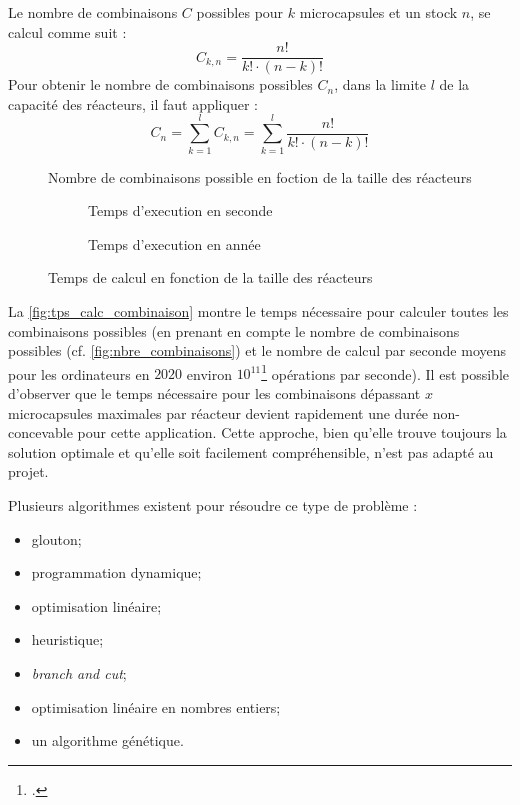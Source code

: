Le nombre de combinaisons $C$ possibles pour $k$ \glspl{microcapsule} et un stock $n$, se calcul comme suit :
\begin{equation}
    C_{k,n} = \frac{n!}{k!\cdot(n-k)!}
    \label{eq:combinaison}
\end{equation}
Pour obtenir le nombre de combinaisons possibles $C_n$, dans la limite $l$ de la capacité des réacteurs, il faut appliquer :
\begin{equation}
    C_{n} = \sum_{k = 1}^{l} C_{k,n} = \sum_{k=1}^{l}\frac{n!}{k!\cdot (n-k)!}
    \label{eq:nbre_combinaisons}
\end{equation} 
\begin{figure}[H]
    \centering
    
    \caption{Nombre de combinaisons possible en foction de la taille des réacteurs}
    \label{fig:nbre_combinaisons}
\end{figure}

\begin{figure}[H]
    \centering
    \begin{subfigure}{0.5\textwidth}
        \centering
        
        \caption{Temps d'execution en seconde}
    \end{subfigure}\hfill
    \begin{subfigure}{0.5\textwidth}
        \centering
        
        \caption{Temps d'execution en année}
    \end{subfigure}
    \caption{Temps de calcul en fonction de la taille des réacteurs}
    \label{fig:tps_calc_combinaison}
\end{figure}
La \autoref{fig:tps_calc_combinaison} montre le temps nécessaire pour calculer toutes les combinaisons possibles (en prenant en compte le nombre de combinaisons possibles (cf. \autoref{fig:nbre_combinaisons}) et le nombre de calcul par seconde moyens pour les ordinateurs en $2020$ environ $10^{11}$\footcite{petite_analyse_nbre_calculs_par_sec} opérations par seconde). Il est possible d'observer que le temps nécessaire pour les combinaisons dépassant $x$ \glspl{microcapsule} maximales par réacteur devient rapidement une durée non-concevable pour cette application.
Cette approche, bien qu'elle trouve toujours la solution optimale et qu'elle soit facilement compréhensible, n'est pas adapté au projet.

Plusieurs algorithmes existent pour résoudre ce type de problème : 
\begin{itemize}
    \item glouton;
    \item programmation dynamique;
    \item optimisation linéaire;
    \item heuristique;
    \item \textit{branch and cut};
    \item optimisation linéaire en nombres entiers;
    \item un algorithme génétique.
\end{itemize}

